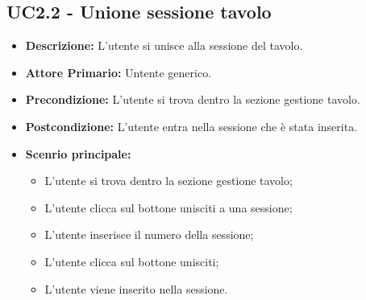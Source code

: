 \subsection{UC2.2 - Unione sessione tavolo}
\begin{itemize}
    \item \textbf{Descrizione:} L'utente si unisce alla sessione del tavolo.
    \item \textbf{Attore Primario:} Untente generico.
    \item \textbf{Precondizione:} L'utente si trova dentro la sezione gestione tavolo.
    \item \textbf{Postcondizione:} L'utente entra nella sessione che è stata inserita.
    \item \textbf{Scenrio principale:}
    \begin{itemize}
        \item L'utente si trova dentro la sezione gestione tavolo;
        \item L'utente clicca sul bottone unisciti a una sessione;
        \item L'utente inserisce il numero della sessione;
        \item L'utente clicca sul bottone unisciti;
        \item L'utente viene inserito nella sessione.
    \end{itemize}
\end{itemize}

